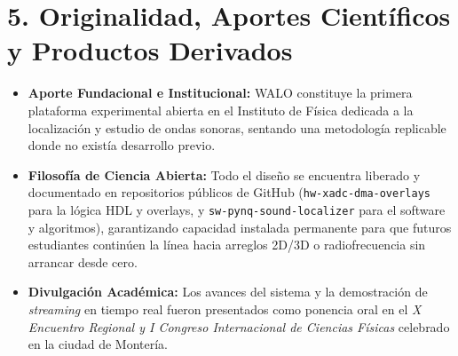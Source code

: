 \documentclass[10.5pt,letterpaper]{article}
\begin{document}
\section*{5. Originalidad, Aportes Científicos y Productos Derivados}
\begin{itemize}
    \item \textbf{Aporte Fundacional e Institucional:} WALO constituye la primera plataforma experimental abierta en el Instituto de Física dedicada a la localización y estudio de ondas sonoras, sentando una metodología replicable donde no existía desarrollo previo.
    \item \textbf{Filosofía de Ciencia Abierta:} Todo el diseño se encuentra liberado y documentado en repositorios públicos de GitHub (\texttt{hw-xadc-dma-overlays} para la lógica HDL y overlays, y \texttt{sw-pynq-sound-localizer} para el software y algoritmos), garantizando capacidad instalada permanente para que futuros estudiantes continúen la línea hacia arreglos 2D/3D o radiofrecuencia sin arrancar desde cero.
    \item \textbf{Divulgación Académica:} Los avances del sistema y la demostración de \textit{streaming} en tiempo real fueron presentados como ponencia oral en el \textit{X Encuentro Regional y I Congreso Internacional de Ciencias Físicas} celebrado en la ciudad de Montería.
\end{itemize}
\end{document}
